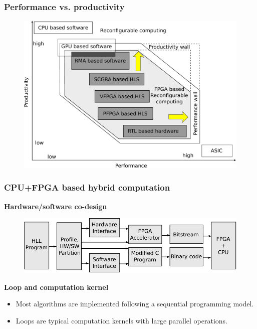 \documentclass{beamer}
\begin{document}
\begin{frame}[t]

\frametitle{Performance vs. productivity}
\begin{figure}
\includegraphics[width=0.8\linewidth]{performance-vs-productivity}
\end{figure}

\end{frame}

\begin{frame}[t]
\frametitle{CPU+FPGA based hybrid computation}

\textbf{Hardware/software co-design}
\begin{figure}
\includegraphics[width=0.8\linewidth]{codesign}
\end{figure}

\textbf{Loop and computation kernel}
\begin{itemize}
\item Most algorithms are implemented following a sequential programming model.
\item Loops are typical computation kernels with large parallel operations.
\end{itemize}

\end{frame}
\end{document}
